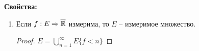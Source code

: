 \textbf{Свойства:}


\begin{enumerate}
    \item Если $f:E\Rightarrow \overline{\mathbb{R}}$ измерима, то $E$ – измеримое множество.
    
    \begin{proof}
        $E=\bigcup\limits_{n=1}^\infty E\{f < n\}$
    \end{proof}
\end{enumerate}